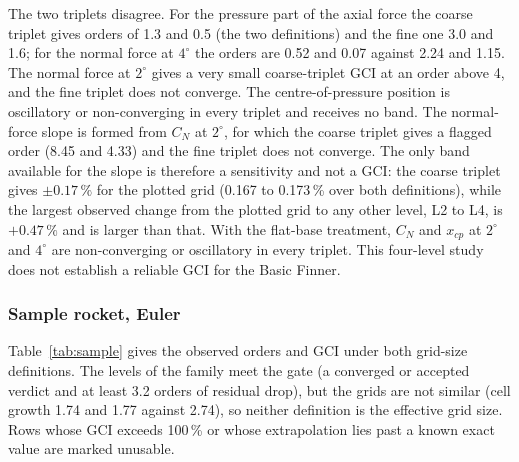 \documentclass[11pt,a4paper]{article}
\begin{document}
The two triplets disagree.
For the pressure part of the axial force the coarse triplet gives orders of 1.3 and 0.5 (the two definitions) and the fine one
3.0 and 1.6; for the normal force at $4^\circ$ the orders are 0.52 and 0.07 against 2.24 and 1.15.
The normal force at $2^\circ$ gives a very small coarse-triplet GCI at an order above 4, and the fine triplet does not
converge.
The centre-of-pressure position is oscillatory or non-converging in every triplet and receives no band.
The normal-force slope is formed from $C_N$ at $2^\circ$, for which the coarse triplet gives a flagged order (8.45 and 4.33) and the fine triplet
does not converge.
The only band available for the slope is therefore a sensitivity and not a GCI: the coarse triplet gives $\pm0.17\,\%$ for the
plotted grid (0.167 to 0.173\,\% over both definitions), while the largest observed change from the plotted grid to any
other level, L2 to L4, is $+0.47\,\%$ and is larger than that.
With the flat-base treatment, $C_N$ and $x_{cp}$ at $2^\circ$ and $4^\circ$ are non-converging or oscillatory in every triplet.
This four-level study does not establish a reliable GCI for the Basic Finner.

\subsubsection{Sample rocket, Euler}

Table~\ref{tab:sample} gives the observed orders and GCI under both grid-size definitions.
The levels of the family meet the gate (a converged or accepted verdict and at least 3.2 orders of residual drop), but the grids are not similar (cell growth 1.74 and 1.77
against 2.74), so neither definition is the effective grid size.
Rows whose GCI exceeds 100\,\% or whose extrapolation lies past a known exact value are marked unusable.
\end{document}
